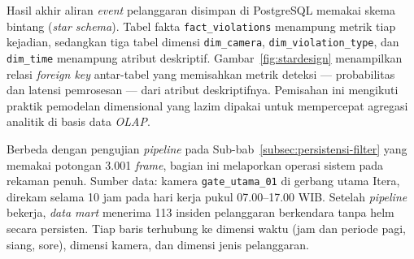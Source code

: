 Hasil akhir aliran \textit{event} pelanggaran disimpan di PostgreSQL memakai skema bintang (\textit{star schema}). Tabel fakta \texttt{fact\_violations} menampung metrik tiap kejadian, sedangkan tiga tabel dimensi \texttt{dim\_camera}, \texttt{dim\_violation\_type}, dan \texttt{dim\_time} menampung atribut deskriptif. Gambar~\ref{fig:stardesign} menampilkan relasi \textit{foreign key} antar-tabel yang memisahkan metrik deteksi --- probabilitas dan latensi pemrosesan --- dari atribut deskriptifnya. Pemisahan ini mengikuti praktik pemodelan dimensional yang lazim dipakai untuk mempercepat agregasi analitik di basis data \textit{OLAP}.


Berbeda dengan pengujian \textit{pipeline} pada Sub-bab~\ref{subsec:persistensi-filter} yang memakai potongan 3.001 \textit{frame}, bagian ini melaporkan operasi sistem pada rekaman penuh. Sumber data: kamera \texttt{gate\_utama\_01} di gerbang utama Itera, direkam selama 10 jam pada hari kerja pukul 07.00--17.00 WIB. Setelah \textit{pipeline} bekerja, \textit{data mart} menerima 113 insiden pelanggaran berkendara tanpa helm secara persisten. Tiap baris terhubung ke dimensi waktu (jam dan periode pagi, siang, sore), dimensi kamera, dan dimensi jenis pelanggaran.



